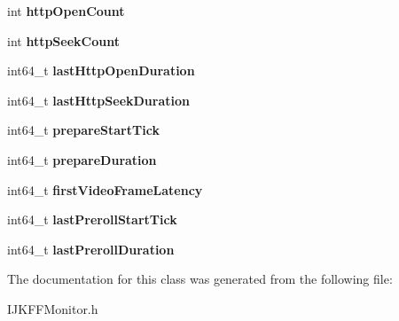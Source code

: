\begin{DoxyCompactItemize}
\item 
\mbox{\label{interface_i_j_k_f_f_monitor_ad8947b8f0ad5b7ac85dede0231b8a79a}} 
int {\bfseries http\+Open\+Count}
\item 
\mbox{\label{interface_i_j_k_f_f_monitor_a58ad94d39e1ccd9cd576240f561e289d}} 
int {\bfseries http\+Seek\+Count}
\item 
\mbox{\label{interface_i_j_k_f_f_monitor_aa89a953d8a910128daa702b8cdf257ba}} 
int64\+\_\+t {\bfseries last\+Http\+Open\+Duration}
\item 
\mbox{\label{interface_i_j_k_f_f_monitor_a14276356a7f783edf767b9982acee597}} 
int64\+\_\+t {\bfseries last\+Http\+Seek\+Duration}
\item 
\mbox{\label{interface_i_j_k_f_f_monitor_a9f5930b8a180f604bf8bce0bf41102d7}} 
int64\+\_\+t {\bfseries prepare\+Start\+Tick}
\item 
\mbox{\label{interface_i_j_k_f_f_monitor_ad33dfab180a43cdd0de4c1f50a8e4778}} 
int64\+\_\+t {\bfseries prepare\+Duration}
\item 
\mbox{\label{interface_i_j_k_f_f_monitor_a7c7db7e8f78b655b13253e730ab6c04b}} 
int64\+\_\+t {\bfseries first\+Video\+Frame\+Latency}
\item 
\mbox{\label{interface_i_j_k_f_f_monitor_a1e9df85a74ebe80e1175dfdcf33d6b28}} 
int64\+\_\+t {\bfseries last\+Preroll\+Start\+Tick}
\item 
\mbox{\label{interface_i_j_k_f_f_monitor_a34d0ce3b76d866ca102bc08a9dd45c58}} 
int64\+\_\+t {\bfseries last\+Preroll\+Duration}
\end{DoxyCompactItemize}


The documentation for this class was generated from the following file\+:\begin{DoxyCompactItemize}
\item 
I\+J\+K\+F\+F\+Monitor.\+h\end{DoxyCompactItemize}
